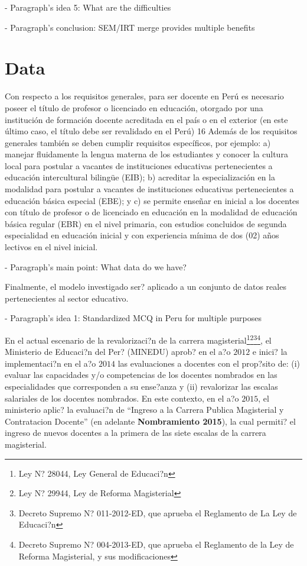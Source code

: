 - Paragraph's idea 5: What are the difficulties


- Paragraph's conclusion: SEM/IRT merge provides multiple benefits




\section{Data}

Con respecto a los requisitos generales, para ser docente en Perú es necesario poseer el título de profesor o licenciado en educación, otorgado por una institución de formación docente acreditada en el país o en el exterior (en este último caso, el título debe ser revalidado en el Perú) 16 Además de los requisitos generales también se deben cumplir requisitos específicos, por ejemplo: a) manejar fluidamente la lengua materna de los estudiantes y conocer la cultura local para postular a vacantes de instituciones educativas pertenecientes a educación intercultural bilingüe (EIB); b) acreditar la especialización en la modalidad para postular a vacantes de instituciones educativas pertenecientes a educación básica especial (EBE); y c) se permite enseñar en inicial a los docentes con título de profesor o de licenciado en educación en la modalidad de educación básica regular (EBR) en el nivel primaria, con estudios concluidos de segunda especialidad en educación inicial y con experiencia mínima de dos (02) años lectivos en el nivel inicial.


- Paragraph's main point: What data do we have?

Finalmente, el modelo investigado ser? aplicado a un conjunto de datos reales pertenecientes al sector educativo. 


- Paragraph's idea 1: Standardized MCQ in Peru for multiple purposes

En el actual escenario de la revalorizaci?n de la carrera magisterial\footnote{Ley N? 28044, Ley General de Educaci?n}\footnote{Ley N? 29944, Ley de Reforma Magisterial}\footnote{Decreto Supremo N? 011-2012-ED, que aprueba el Reglamento de La Ley de Educaci?n}\footnote{Decreto Supremo N? 004-2013-ED, que aprueba el Reglamento de la Ley de Reforma Magisterial, y sus modificaciones}, el Ministerio de Educaci?n del Per? (MINEDU) aprob? en el a?o $2012$ e inici? la implementaci?n en el a?o $2014$ las evaluaciones a docentes con el prop?sito de: (i) evaluar las capacidades y/o competencias de los docentes nombrados en las especialidades que corresponden a su ense?anza y (ii) revalorizar las escalas salariales de los docentes nombrados. En este contexto, en el a?o $2015$, el ministerio aplic? la evaluaci?n de ``Ingreso a la Carrera Publica Magisterial y Contratacion Docente'' (en adelante \textbf{Nombramiento 2015}), la cual permiti? el ingreso de nuevos docentes a la primera de las siete escalas de la carrera magisterial.


